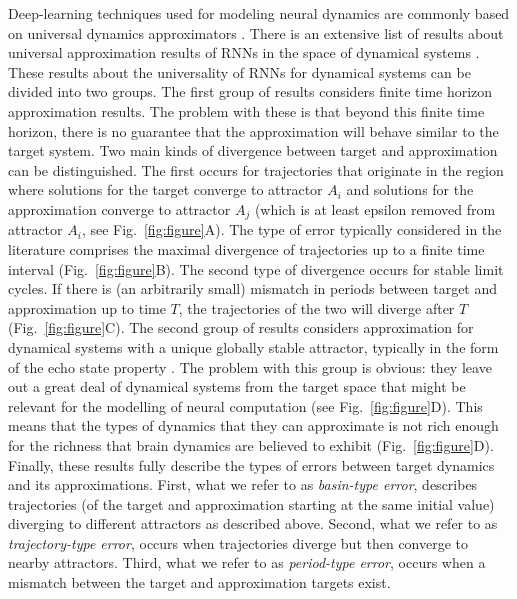 \documentclass[10pt]{article}
\begin{document}
\noindent
Deep-learning techniques used for modeling neural dynamics are commonly based on universal dynamics approximators \citep{durstewitz2023reconstructing}.
There is an extensive list of results about universal approximation results of RNNs in the space of dynamical systems \citep{li2022approximation,jiang2023brief}.
These results about the universality of RNNs for dynamical systems can be divided into two groups.
 The first group of results considers finite time horizon approximation results.
  The problem with these is that beyond this finite time horizon, there is no guarantee that the approximation will behave similar to the target system.
   Two main kinds of divergence between target and approximation can be distinguished.
   The first occurs for trajectories that originate in the region where solutions for the target converge to attractor $A_i$ and solutions for the approximation converge to attractor $A_j$ (which is at least epsilon removed from attractor $A_i$, see Fig.~\ref{fig:figure}A). 
   The type of error typically considered in the literature comprises the maximal divergence of trajectories up to a finite time interval (Fig.~\ref{fig:figure}B).
   The second type of divergence occurs for stable limit cycles. If there is (an arbitrarily small) mismatch in periods between target and approximation up to time $T$, the trajectories of the two will diverge after $T$ (Fig.~\ref{fig:figure}C).
  The second group of results considers approximation for dynamical systems with a unique globally stable attractor, typically in the form of the echo state property \citep{jaeger2001echo}.
   The problem with this group is obvious: they leave out a great deal of dynamical systems from the target space that might be relevant for the modelling of neural computation \citep{wong2006timeintegration,mante2013context} (see Fig.~\ref{fig:figure}D).
    This means that the types of dynamics that they can approximate is not rich enough for the richness that brain dynamics are believed to exhibit (Fig.~\ref{fig:figure}D). 
Finally, these results fully describe the types of errors between target dynamics and its approximations.
  First, what we refer to as \emph{basin-type error}, describes trajectories (of the target and approximation starting at the same initial value) diverging to different attractors as described above.
  Second, what we refer to as \emph{trajectory-type error}, occurs when trajectories diverge but then converge to nearby attractors. %
  Third, what we refer to as \emph{period-type error}, occurs when a mismatch between the target and approximation targets exist.
  
\end{document}
